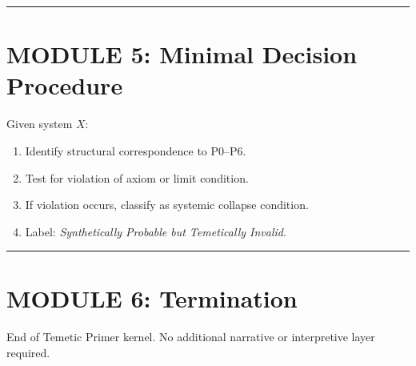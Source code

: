 \documentclass{article}
\begin{document}
\bigskip
\hrule
\bigskip

\section*{MODULE 5: Minimal Decision Procedure}

Given system $X$:

\begin{enumerate}
    \item Identify structural correspondence to P0--P6.
    \item Test for violation of axiom or limit condition.
    \item If violation occurs, classify as systemic collapse condition.
    \item Label: \textit{Synthetically Probable but Temetically Invalid}.
\end{enumerate}

\bigskip
\hrule
\bigskip

\section*{MODULE 6: Termination}

End of Temetic Primer kernel. No additional narrative or interpretive layer required.
\end{document}
